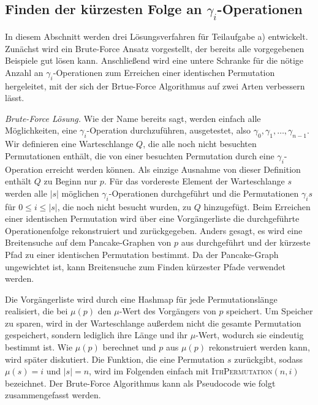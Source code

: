 \documentclass[a4paper, 11pt, ngerman]{article}
\begin{document}
\subsection{Finden der kürzesten Folge an $\gamma_i$-Operationen}

In diesem Abschnitt werden drei Lösungsverfahren für Teilaufgabe a) entwickelt. Zunächst wird ein Brute-Force Ansatz vorgestellt, der bereits alle vorgegebenen Beispiele gut lösen kann. Anschließend wird eine untere Schranke für die nötige Anzahl an $\gamma_i$-Operationen zum Erreichen einer identischen Permutation hergeleitet, mit der sich der Brtue-Force Algorithmus auf zwei Arten verbessern lässt.
\bigskip

\noindent \emph{Brute-Force Lösung.} Wie der Name bereits sagt, werden einfach alle Möglichkeiten, eine $\gamma_i$-Operation durchzuführen, ausgetestet, also $\gamma_0, \gamma_1, \dots, \gamma_{n-1}$. Wir definieren eine Warteschlange $Q$, die alle noch nicht besuchten Permutationen enthält, die von einer besuchten Permutation durch eine $\gamma_i$-Operation erreicht werden können. Als einzige Ausnahme von dieser Definition enthält $Q$ zu Beginn nur $p$. Für das vordereste Element der Warteschlange $s$ werden alle $|s|$ möglichen $\gamma_i$-Operationen durchgeführt und die Permutationen $\gamma_i s$ für $0 \le i \le |s|$, die noch nicht besucht wurden, zu $Q$ hinzugefügt. Beim Erreichen einer identischen Permutation wird über eine Vorgängerliste die durchgeführte Operationenfolge rekonstruiert und zurückgegeben. Anders gesagt, es wird eine Breitensuche auf dem Pancake-Graphen von $p$ aus durchgeführt und der kürzeste Pfad zu einer identischen Permutation bestimmt. Da der Pancake-Graph ungewichtet ist, kann Breitensuche zum Finden kürzester Pfade verwendet werden.

Die Vorgängerliste wird durch eine Hashmap für jede Permutationslänge realisiert, die bei $\mu(p)$ den $\mu$-Wert des Vorgängers von $p$ speichert. Um Speicher zu sparen, wird in der Warteschlange außerdem nicht die gesamte Permutation gespeichert, sondern lediglich ihre Länge und ihr $\mu$-Wert, wodurch sie eindeutig bestimmt ist. Wie $\mu(p)$ berechnet und $p$ aus $\mu(p)$ rekonstruiert werden kann, wird später diskutiert. Die Funktion, die eine Permutation $s$ zurückgibt, sodass $\mu(s) = i$ und $|s| = n$, wird im Folgenden einfach mit \textsc{IthPermutation}$(n, i)$ bezeichnet. Der Brute-Force Algorithmus kann als Pseudocode wie folgt zusammengefasst werden.
\end{document}

